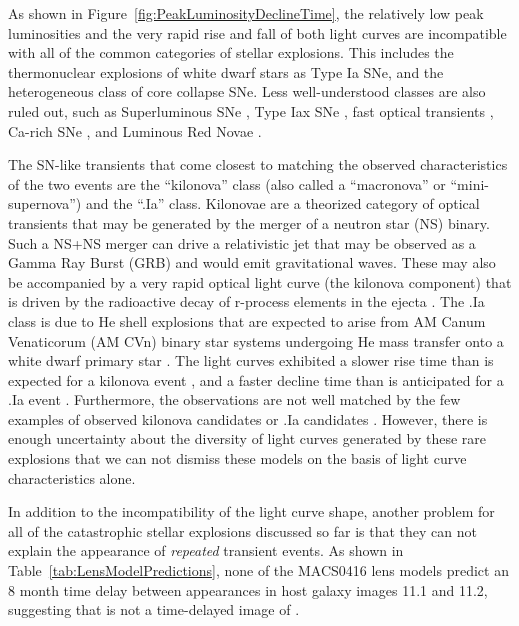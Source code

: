 As shown in Figure~\ref{fig:PeakLuminosityDeclineTime}, the relatively
low peak luminosities and the very rapid rise and fall of both \spock
light curves are incompatible with all of the common categories of
stellar explosions. This includes the thermonuclear explosions of
white dwarf stars as Type Ia SNe, and the heterogeneous class of
core collapse SNe.  Less well-understood classes are also
ruled out, such as Superluminous SNe \citep{Gal-Yam:2012,Arcavi:2016},
Type Iax SNe \citep{Foley:2013a}, fast optical transients
\citep{Drout:2014}, Ca-rich SNe
\citep{Filippenko:2003,Perets:2011,Kasliwal:2012}, and Luminous Red
Novae \citep[also called intermediate luminosity red
  transients;][]{Munari:2002,Kulkarni:2007,Kasliwal:2011b}.

The SN-like transients that come closest to matching the observed
characteristics of the two \spock events are the ``kilonova'' class
(also called a ``macronova'' or ``mini-supernova'') and the ``.Ia''
class.  Kilonovae are a theorized category of optical transients that
may be generated by the merger of a neutron star (NS) binary. Such a
NS+NS merger can drive a relativistic jet that may be observed as a
Gamma Ray Burst (GRB) and would emit gravitational waves.  These may
also be accompanied by a very rapid optical light curve (the kilonova
component) that is driven by the radioactive decay of r-process
elements in the ejecta \citep{Li:1998,Kulkarni:2005}.  The .Ia class
is due to He shell explosions that are expected to arise from AM Canum
Venaticorum (AM CVn) binary star systems undergoing He mass transfer
onto a white dwarf primary star \citep{Warner:1995,
  Nelemans:2005,Bildsten:2007}.  The \spock light curves exhibited a
slower rise time than is expected for a kilonova event
\citep[e.g.,][]{Metzger:2010,Barnes:2013,Kasen:2015}, and a faster
decline time than is anticipated for a .Ia event
\citep[e.g.,][]{Shen:2010}.  Furthermore, the \spock observations are not
well matched by the few examples of observed kilonova candidates
\citep{Perley:2009,Tanvir:2013} or .Ia candidates
\citep{Kasliwal:2010, Perets:2010, Poznanski:2010}.  However, there is
enough uncertainty about the diversity of light curves generated by
these rare explosions that we can not dismiss these models on the
basis of light curve characteristics alone.

In addition to the incompatibility of the light curve shape, another
problem for all of the catastrophic stellar explosions discussed so
far is that they can not explain the appearance of {\it repeated}
transient events.  As shown in Table~\ref{tab:LensModelPredictions}, none of
the MACS0416 lens models predict an 8 month time delay between
appearances in host galaxy images 11.1 and 11.2, suggesting that
\spocktwo is not a time-delayed image of \spockone \citep[as was the
  case for the 5th image of SN Refsdal][]{Kelly:2015a,Kelly:2016}.

